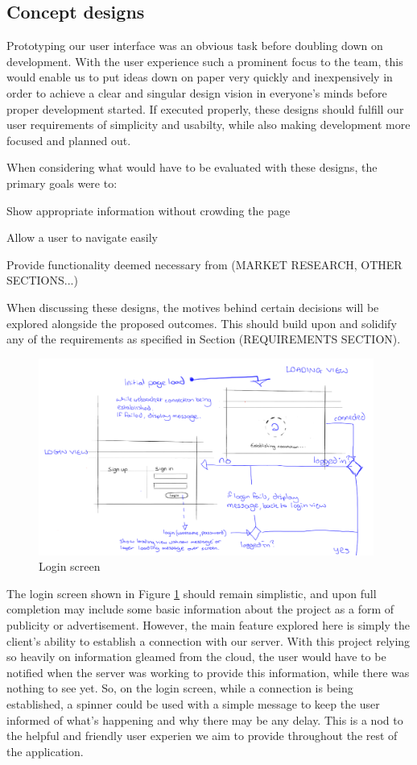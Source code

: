 \documentclass{l3proj}
\begin{document}
\subsection{Concept designs}

Prototyping our user interface was an obvious task before doubling down on development. With the user experience such a prominent focus to the team, this would enable us to put ideas down on paper very quickly and inexpensively in order to achieve a clear and singular design vision in everyone's minds before proper development started. If executed properly, these designs should fulfill our user requirements of simplicity and usabilty, while also making development more focused and planned out.

When considering what would have to be evaluated with these designs, the primary goals were to:

Show appropriate information without crowding the page

Allow a user to navigate easily

Provide functionality deemed necessary from (MARKET RESEARCH, OTHER SECTIONS...)

When discussing these designs, the motives behind certain decisions will be explored alongside the proposed outcomes. This should build upon and solidify any of the requirements as specified in Section (REQUIREMENTS SECTION).

\begin{figure}[H]
\centering
\includegraphics[width=110mm]{Concept_Designs/Login.png}
\caption{Login screen}
\label{fig:Login}
\end{figure}

The login screen shown in Figure \ref{fig:Login} should remain simplistic, and upon full completion may include some basic information about the project as a form of publicity or advertisement. However, the main feature explored here is simply the client's ability to establish a connection with our server.  With this project relying so heavily on information gleamed from the cloud, the user would have to be notified when the server was working to provide this information, while there was nothing to see yet. So, on the login screen, while a connection is being established, a spinner could be used with a simple message to keep the user informed of what's happening and why there may be any delay. This is a nod to the helpful and friendly user experien we aim to provide throughout the rest of the application.
\end{document}
